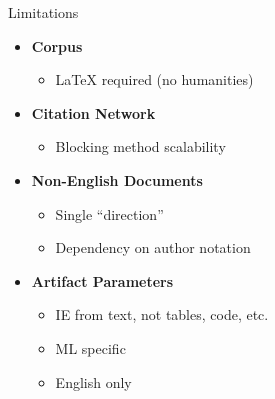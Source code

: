 \documentclass[en,16:9,smallfoot]{sdqbeamer}
\begin{document}
   \begin{frame}{Limitations}
    \begin{itemize}
    \item \textbf{Corpus}
        \begin{itemize}
        \item \LaTeX{} required (no humanities)
        \end{itemize}
    \item \textbf{Citation Network}
        \begin{itemize}
        \item Blocking method scalability
        \end{itemize}
    \item \textbf{Non-English Documents}
        \begin{itemize}
        \item Single ``direction''
        \item Dependency on author notation
        \end{itemize}
    \item \textbf{Artifact Parameters}
        \begin{itemize}
        \item IE from text, not tables, code, etc.
        \item ML specific
        \item English only
        \end{itemize}
    \end{itemize}
   \end{frame}

\end{document}
